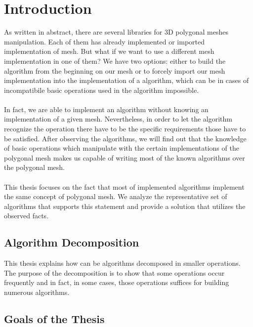 \chapter*{Introduction}

As written in abstract, there are several libraries for 3D polygonal meshes manipulation.
Each of them has already implemented or imported implementation of mesh. But what if we want to use
a different mesh implementation in one of them? We have two options: either to build
the algorithm from the beginning on our mesh or to forcely import our mesh implementation into
the implementation of a algorithm, which can be in cases of incompatibile basic operations
used in the algorithm impossible.\\
\\
In fact, we are able to implement an algorithm without knowing an implementation of
a given mesh. Nevertheless, in order to let the algorithm recognize the operation there
have to be the specific requirements those have to be satisfied.
After observing the algorithms, we will find out that
the knowledge of basic operations which manipulate with the certain implementations of the polygonal mesh
makes us capable of writing most of the known algorithms over the polygonal mesh.\\
\\
This thesis focuses on the fact that most of implemented algorithms implement the
same concept of polygonal mesh. We analyze the representative set of algorithms that
supports this statement and provide a solution that utilizes the observed facts.

\section*{Algorithm Decomposition}

This thesis explains how can be algorithms decomposed in smaller operations.
The purpose of the decomposition is to show that some operations occur frequently
and in fact, in some cases, those operations suffices for building numerous algorithms.

\section*{Goals of the Thesis}

